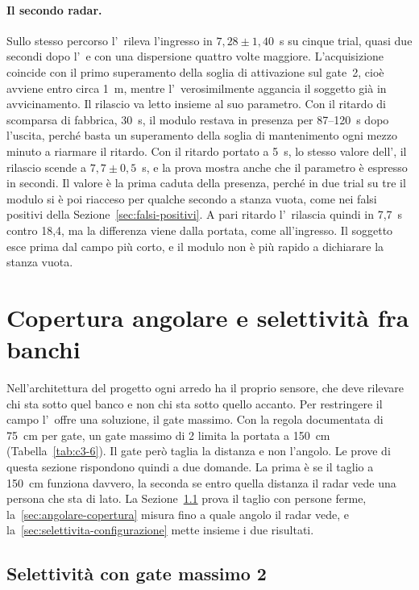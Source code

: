 \paragraph{Il secondo radar.} Sullo stesso percorso l'\ldc\ rileva l'ingresso in
$7{,}28 \pm 1{,}40$~s su cinque trial, quasi due secondi dopo l'\ldb\ e con una
dispersione quattro volte maggiore. L'acquisizione coincide con il primo superamento della soglia di attivazione sul gate~2, cioè avviene entro circa 1~m, mentre l'\ldb\ verosimilmente aggancia il soggetto già in avvicinamento. Il rilascio va
letto insieme al suo parametro. Con il ritardo di scomparsa di fabbrica, 30~s, il
modulo restava in presenza per 87--120~s dopo l'uscita, perché basta un superamento
della soglia di mantenimento ogni mezzo minuto a riarmare il ritardo. Con il ritardo portato a 5~s, lo stesso valore dell'\ldb, il rilascio scende a $7{,}7 \pm 0{,}5$~s, e la prova mostra anche che il parametro è espresso in secondi. Il valore è la prima caduta della presenza, perché in due trial su tre il modulo si è poi riacceso per qualche secondo a stanza vuota, come nei falsi positivi della Sezione~\ref{sec:falsi-positivi}. A pari ritardo l'\ldc\ rilascia quindi in 7,7~s contro 18,4, ma la differenza viene dalla portata, come all'ingresso. Il soggetto esce prima dal campo più corto, e il modulo non è più rapido a dichiarare la stanza vuota.

\section{Copertura angolare e selettività fra banchi}
\label{sec:angolare}

Nell'architettura del progetto ogni arredo ha il proprio sensore, che deve rilevare chi sta sotto quel banco e non chi sta sotto quello accanto. Per restringere il campo l'\ldb\ offre una soluzione, il gate massimo. Con la regola documentata di 75~cm per gate, un gate massimo di 2 limita la portata a 150~cm (Tabella~\ref{tab:c3-6}). Il gate però taglia la distanza e non l'angolo. Le prove di questa sezione rispondono quindi a due domande. La prima è se il taglio a 150~cm funziona davvero, la seconda se entro quella distanza il radar vede una persona che sta di lato. La Sezione~\ref{sec:selettivita} prova il taglio con persone ferme, la~\ref{sec:angolare-copertura} misura fino a quale angolo il radar vede, e la~\ref{sec:selettivita-configurazione} mette insieme i due risultati.

\subsection{Selettività con gate massimo 2}
\label{sec:selettivita}

